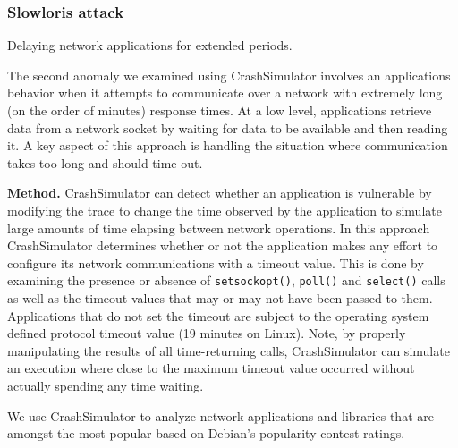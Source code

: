 \subsubsection{Slowloris attack} Delaying network applications for extended
periods.




The second anomaly we examined using CrashSimulator
involves an applications behavior when it attempts to communicate over a network
with extremely long (on the order of minutes) response times.  At a low level,
applications retrieve data from a network socket by waiting for data to be
available and then reading it.  A key aspect of this approach is handling the 
situation where communication takes too long and should time out.

{\bf Method.}
CrashSimulator can detect whether an application is vulnerable by modifying
the trace to change the time observed by the application to simulate large
amounts of time elapsing between network operations.
In this approach CrashSimulator determines
whether or not the application makes any effort to configure its network
communications with a timeout value. This is done by examining the presence or
absence of {\tt setsockopt()}, {\tt poll()} and {\tt select()} calls as well as
the timeout values that may or may not have been passed to them. Applications
that do not set the timeout are subject to the operating
system defined protocol timeout value (19 minutes on Linux).
Note, by properly manipulating the results of all
time-returning calls, CrashSimulator can simulate an execution where close to
the maximum timeout value occurred without actually spending any time
waiting.


We use CrashSimulator to analyze  network applications and libraries
that are amongst the most popular based on Debian's popularity contest 
ratings\cite{DebPopCon}. 

